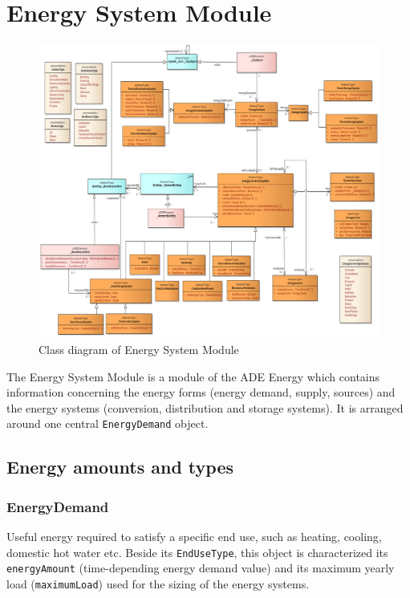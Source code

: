 \documentclass[a4paper,12pt]{article}
\let\stdsection\section%
\renewcommand\section{\newpage\stdsection}
\begin{document}
\section{Energy System Module}\label{energy-system-module}

\begin{figure}[htbp]
\centering
\includegraphics{fig/class_EnergySystem.png}
\caption{Class diagram of Energy System Module}
\end{figure}

The Energy System Module is a module of the ADE Energy which contains
information concerning the energy forms (energy demand, supply, sources)
and the energy systems (conversion, distribution and storage systems).
It is arranged around one central \lstinline!EnergyDemand! object.

\subsection{Energy amounts and types}\label{energy-amounts-and-types}

\subsubsection{EnergyDemand}\label{energydemand}

Useful energy required to satisfy a specific end use, such as heating,
cooling, domestic hot water etc. Beside its \lstinline!EndUseType!, this
object is characterized its \lstinline!energyAmount! (time-depending
energy demand value) and its maximum yearly load
(\lstinline!maximumLoad!) used for the sizing of the energy systems.
\end{document}
